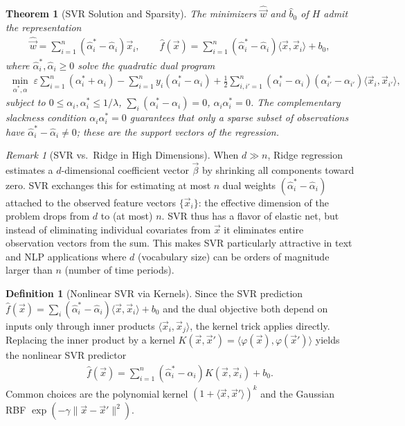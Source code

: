 \documentclass[11pt]{article}
\theoremstyle{definition}
\newtheorem{definition}{Definition}[section]
\theoremstyle{plain}
\newtheorem{theorem}{Theorem}[section]
\theoremstyle{remark}
\newtheorem{remark}{Remark}[section]
\begin{document}
\begin{theorem}[SVR Solution and Sparsity]
    The minimizers $\hat{\vec{w}}$ and $\hat{b}_0$ of $H$ admit the representation
    \begin{align}
        \hat{\vec{w}} = \sum_{i=1}^n (\hat{\alpha}_i^* - \hat{\alpha}_i)\vec{x}_i, \qquad \hat{f}(\vec{x}) = \sum_{i=1}^n (\hat{\alpha}_i^* - \hat{\alpha}_i)\langle\vec{x},\vec{x}_i\rangle + b_0,
    \end{align}
    where $\hat{\alpha}_i^*, \hat{\alpha}_i \geq 0$ solve the quadratic dual program
    \begin{align}
        \min_{\alpha^*,\alpha} \; \varepsilon\sum_{i=1}^n(\alpha_i^* + \alpha_i) - \sum_{i=1}^n y_i(\alpha_i^* - \alpha_i) + \frac{1}{2}\sum_{i,i'=1}^n (\alpha_i^* - \alpha_i)(\alpha_{i'}^* - \alpha_{i'})\langle\vec{x}_i,\vec{x}_{i'}\rangle,
    \end{align}
    subject to $0 \leq \alpha_i, \alpha_i^* \leq 1/\lambda$, $\sum_i(\alpha_i^*-\alpha_i) = 0$, $\alpha_i\alpha_i^* = 0$. The complementary slackness condition $\alpha_i\alpha_i^* = 0$ guarantees that only a sparse subset of observations have $\hat{\alpha}_i^* - \hat{\alpha}_i \neq 0$; these are the \emph{support vectors of the regression}.
\end{theorem}

\begin{remark}[SVR vs.\ Ridge in High Dimensions]
    When $d \gg n$, Ridge regression estimates a $d$-dimensional coefficient vector $\vec{\beta}$ by shrinking all components toward zero. SVR exchanges this for estimating at most $n$ dual weights $(\hat{\alpha}_i^* - \hat{\alpha}_i)$ attached to the observed feature vectors $\{\vec{x}_i\}$: the effective dimension of the problem drops from $d$ to (at most) $n$. SVR thus has a flavor of elastic net, but instead of eliminating individual covariates from $\vec{x}$ it eliminates entire observation vectors from the sum. This makes SVR particularly attractive in text and NLP applications where $d$ (vocabulary size) can be orders of magnitude larger than $n$ (number of time periods).
\end{remark}

\begin{definition}[Nonlinear SVR via Kernels]
    Since the SVR prediction $\hat{f}(\vec{x}) = \sum_i (\hat{\alpha}_i^* - \hat{\alpha}_i)\langle\vec{x},\vec{x}_i\rangle + b_0$ and the dual objective both depend on inputs only through inner products $\langle\vec{x}_i,\vec{x}_j\rangle$, the kernel trick applies directly. Replacing the inner product by a kernel $K(\vec{x},\vec{x}') = \langle\varphi(\vec{x}),\varphi(\vec{x}')\rangle$ yields the nonlinear SVR predictor
    \begin{align}
        \hat{f}(\vec{x}) = \sum_{i=1}^n (\hat{\alpha}_i^* - \hat{\alpha}_i) K(\vec{x},\vec{x}_i) + b_0.
    \end{align}
    Common choices are the polynomial kernel $(1 + \langle\vec{x},\vec{x}'\rangle)^k$ and the Gaussian RBF $\exp(-\gamma\|\vec{x}-\vec{x}'\|^2)$.
\end{definition}
\end{document}
